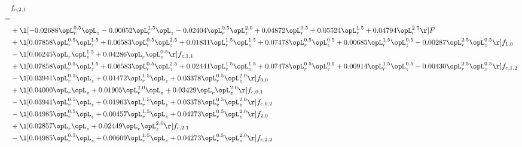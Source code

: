 \begin{alignat}{2} 
\label{eq:f_21_1} 
& f_{c,2,1} \nonumber \\ 
 = \\ 
& + \l[  -0.02688 \opL_r^{0.5} \opL_z   -0.00052 \opL_r^{1.5} \opL_z   -0.02404 \opL_r^{0.5} \opL_z^{2.0} +  0.04872 \opL_r^{0.5} +  0.05524 \opL_r^{1.5} +  0.04794 \opL_r^{2.5}  \r] F \nonumber \\ 
& + \l[  0.07858 \opL_r^{0.5} \opL_z^{1.5} +  0.06583 \opL_r^{0.5} \opL_z^{2.5} +  0.01831 \opL_r^{1.5} \opL_z^{1.5} +  0.07478 \opL_r^{0.5} \opL_z^{0.5} +  0.00685 \opL_r^{1.5} \opL_z^{0.5}   -0.00287 \opL_r^{2.5} \opL_z^{0.5}  \r] f_{1,0} \nonumber \\ 
& - \l[  0.06245 \opL_r \opL_z^{1.5} +  0.04286 \opL_r \opL_z^{0.5}  \r] f_{c,1,1} \nonumber \\ 
& + \l[  0.07858 \opL_r^{0.5} \opL_z^{1.5} +  0.06583 \opL_r^{0.5} \opL_z^{2.5} +  0.02441 \opL_r^{1.5} \opL_z^{1.5} +  0.07478 \opL_r^{0.5} \opL_z^{0.5} +  0.00914 \opL_r^{1.5} \opL_z^{0.5}   -0.00430 \opL_r^{2.5} \opL_z^{0.5}  \r] f_{c,1,2} \nonumber \\ 
& - \l[  0.03941 \opL_r^{0.5} \opL_z +  0.01472 \opL_r^{1.5} \opL_z +  0.03378 \opL_r^{0.5} \opL_z^{2.0}  \r] f_{0,0} \nonumber \\ 
& + \l[  0.04000 \opL_r \opL_z +  0.01905 \opL_r^{2.0} \opL_z +  0.03429 \opL_r \opL_z^{2.0}  \r] f_{c,0,1} \nonumber \\ 
& - \l[  0.03941 \opL_r^{0.5} \opL_z +  0.01963 \opL_r^{1.5} \opL_z +  0.03378 \opL_r^{0.5} \opL_z^{2.0}  \r] f_{c,0,2} \nonumber \\ 
& - \l[  0.04985 \opL_r^{0.5} \opL_z +  0.00457 \opL_r^{1.5} \opL_z +  0.04273 \opL_r^{0.5} \opL_z^{2.0}  \r] f_{2,0} \nonumber \\ 
& + \l[  0.02857 \opL_r \opL_z +  0.02449 \opL_r \opL_z^{2.0}  \r] f_{c,2,1} \nonumber \\ 
& - \l[  0.04985 \opL_r^{0.5} \opL_z +  0.00609 \opL_r^{1.5} \opL_z +  0.04273 \opL_r^{0.5} \opL_z^{2.0}  \r] f_{c,2,2} \nonumber \\ 
\end{alignat} 


